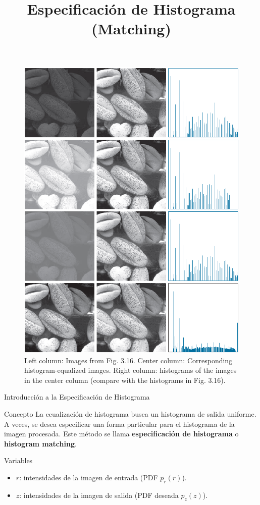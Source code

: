 \documentclass{beamer}
\begin{document}
\begin{frame}
\begin{figure}
    \includegraphics[width=0.45\linewidth]{figuras/Fig_3_20.png}
    \caption{\footnotesize{Left column: Images from Fig. 3.16. Center column: Corresponding histogram-equalized images. Right column: histograms of the images in the center column (compare with the histograms in Fig. 3.16).}}
\end{figure}
\end{frame}



\title[Especificación de Histograma (Matching)]{Especificación de Histograma (Matching)}
\subtitle{}
\author[Tu Nombre/Institución]{}
\date{}
\institute{}
\begin{frame}
  \titlepage
\end{frame}

\begin{frame}{Introducción a la Especificación de Histograma}
 \begin{block}{Concepto}
  La ecualización de histograma busca un histograma de salida uniforme. A veces, se desea especificar una forma particular para el histograma de la imagen procesada. Este método se llama \textbf{especificación de histograma} o \textbf{histogram matching}.
 \end{block}
 \pause
 \begin{exampleblock}{Variables}
  \begin{itemize}
   \item $r$: intensidades de la imagen de entrada (PDF $p_r(r)$).
   \item $z$: intensidades de la imagen de salida (PDF deseada $p_z(z)$).
  \end{itemize}
 \end{exampleblock}
\end{frame}
\end{document}
